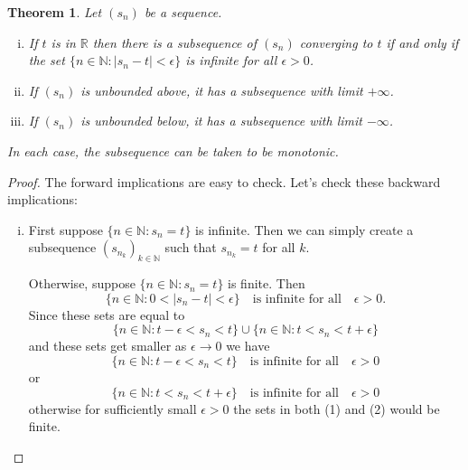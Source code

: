 \documentclass[12pt, lettersize]{book}
\theoremstyle{plain}
\newtheorem{thm}{Theorem}[section]
\theoremstyle{definition}
\theoremstyle{remark}
\begin{document}
		\setcounter{equation}{0}
		\begin{thm}\label{def:limit-subseq}
		Let $(s_n)$ be a sequence.
		\begin{enumerate}[(i)]
			\item If $t$ is in $\mathbb{R}$ then there is a subsequence of $(s_n)$ converging to $t$ if and only if
			the set $\{n\in\mathbb{N}: |s_n-t|<\epsilon\}$ is \emph{infinite} for all $\epsilon>0$.
			\item If $(s_n)$ is unbounded above, it has a subsequence with limit $+\infty$.
			\item If $(s_n)$ is unbounded below, it has a subsequence with limit $-\infty$.
		\end{enumerate}
		In each case, the subsequence can be taken to be \emph{monotonic}.
		\end{thm}
		\begin{proof}
		The forward implications are easy to check. Let's check these backward implications:
		\begin{enumerate}[(i)]
			\item First suppose $\{n\in\mathbb{N}: s_n=t\}$ is infinite. Then we can simply create a subsequence $(s_{n_k})_{k\in\mathbb{N}}$ such that $s_{n_k}=t$ for all $k$.
			
			Otherwise, suppose $\{n\in\mathbb{N}: s_n=t\}$ is finite. Then
			\begin{displaymath}
				\{n\in\mathbb{N}: 0<|s_n-t|<\epsilon\}\quad\text{is infinite for all}\quad\epsilon>0.
			\end{displaymath}
			Since these sets are equal to
			\begin{displaymath}
				\{n\in\mathbb{N}: t-\epsilon<s_n<t\}\cup\{n\in\mathbb{N}: t<s_n<t+\epsilon\}
			\end{displaymath}
			and these sets get smaller as $\epsilon\rightarrow0$ we have
			\begin{equation}
				\{n\in\mathbb{N}: t-\epsilon<s_n<t\}\quad\text{is infinite for all}\quad\epsilon>0
			\end{equation}
			or
			\begin{equation}
				\{n\in\mathbb{N}: t<s_n<t+\epsilon\}\quad\text{is infinite for all}\quad\epsilon>0
			\end{equation}
			otherwise for sufficiently small $\epsilon>0$ the sets in both (1) and (2) would be finite.
			

\end{enumerate}
\end{proof}
\end{document}
